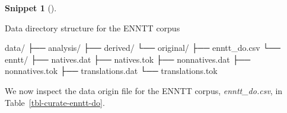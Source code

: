 \documentclass[
  letterpaper,
  krantz1]{latex/krantz-mod}
\newenvironment{Shaded}{\begin{snugshade}}{\end{snugshade}}
\newcommand{\ExtensionTok}[1]{\textcolor[rgb]{0.00,0.00,0.00}{#1}}
\newcommand{\NormalTok}[1]{\textcolor[rgb]{0.00,0.00,0.00}{#1}}
\theoremstyle{definition}
\newtheorem{definition}{Snippet}[chapter]
\theoremstyle{definition}
\theoremstyle{remark}
\begin{document}
\begin{definition}[]\protect\hypertarget{def-curate-enntt-structure}{}\label{def-curate-enntt-structure}

Data directory structure for the ENNTT corpus

\begin{Shaded}
\begin{Highlighting}[]
\ExtensionTok{data/}
\ExtensionTok{├──}\NormalTok{ analysis/}
\ExtensionTok{├──}\NormalTok{ derived/}
\ExtensionTok{└──}\NormalTok{ original/}
    \ExtensionTok{├──}\NormalTok{ enntt\_do.csv}
    \ExtensionTok{└──}\NormalTok{ enntt/}
        \ExtensionTok{├──}\NormalTok{ natives.dat}
        \ExtensionTok{├──}\NormalTok{ natives.tok}
        \ExtensionTok{├──}\NormalTok{ nonnatives.dat}
        \ExtensionTok{├──}\NormalTok{ nonnatives.tok}
        \ExtensionTok{├──}\NormalTok{ translations.dat}
        \ExtensionTok{└──}\NormalTok{ translations.tok}
\end{Highlighting}
\end{Shaded}

\end{definition}

We now inspect the data origin file for the ENNTT corpus,
\emph{enntt\_do.csv}, in
Table~\ref{tbl-curate-enntt-do}.
\end{document}
